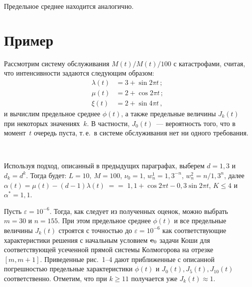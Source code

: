 \begin{multicols}{2}
Предельное среднее находится аналогично.

\section{Пример}

Рассмотрим систему обслуживания $M(t)/M(t)/100$ с катастрофами,
считая, что интенсивности задаются следующим образом: 
\begin{align*}
\lambda(t) &= 3+\sin 2\pi t \,;\\
\mu(t) &= 2 + \cos 2\pi t \,;\\
\xi(t) &=2 + \sin 4 \pi t\,,
\end{align*}
и вычислим предельное среднее $\phi(t)$, а также предельные
величины  $J_k(t)$ при некоторых значениях~$k$. В частности,
$J_0(t)$~--- вероятность того, что в момент~$t$ очередь пуста, т.\,е.\
в системе обслуживания нет ни одного требования.

\medskip

\begin{figure*} %
\vspace*{1pt}
\begin{center}
\mbox{%
\epsfxsize=164.864mm
}
\end{center}
\vspace*{-9pt}
\begin{minipage}[t]{80mm}
\end{minipage}
\hfill
\begin{minipage}[t]{80mm}
\end{minipage}
\end{figure*}


Используя подход, описанный в предыдущих параграфах, выберем $d=1{,}3$
и $d_k = d^k$. Тогда будет: $L=10, \ M=100$, $\nu_0 = 1$, $w_n^1 =
1{,}3^{-n}$, $w_n^2 = n/1{,}3^{n}$, далее $\alpha(t) = \mu(t)
-(d-1)\lambda(t)\;=$\linebreak $=\; 1{,}1 +\cos 2\pi t - 0{,}3 \sin 2\pi t$, $K \le 4$ и
$\alpha^* = 1{,}1$.

Пусть $\varepsilon = 10^{-6}$. Тогда, как следует из полученных
оценок, можно выбрать $m = 30$ и $n = 155$. При этом предельное
среднее  $\phi(t)$ и все предельные величины $J_k(t)$ строятся с
точностью до $\varepsilon = 10^{-6}$ как соответствующие
характеристики решения с начальным условием ${\bf e}_0$ задачи Коши
для соответствующей усеченной прямой системы Колмогорова на отрезке
$[m,m+1]$. Приведенные рис.~1--4 дают приближенные с описанной
погрешностью предельные характеристики $\phi(t)$ и $J_0(t),
J_{5}(t), J_{10}(t)$ соответственно. Отметим, что при $k \ge 11$
получается уже $J_k(t) \approx 1$.


\end{multicols}

